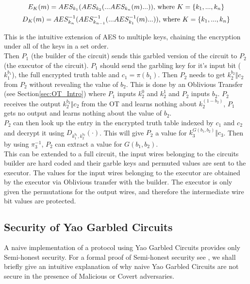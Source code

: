 \documentclass[ %
                    author={Nicholas Tutte},
                supervisor={Prof. Nigel Smart},
                    degree={MEng},
                     title={Secure Two Party Computation},
                  subtitle={A practical comparison of recent protocols},
                      type={Research - GG1K},
                      year={2015} ]{dissertation}
\begin{document}
			$$ E_K(m) = AES_{k_1}( AES_{k_2}( ...AES_{k_n}(m) ...) ) \textnormal{, where } K = \{k_1, ..., k_n\}$$ 
			$$ D_K(m) = AES^{-1}_{k_n}( AES^{-1}_{k_{n-1}}( ...AES^{-1}_{k_1}(m) ...) ) \textnormal{, where } K = \{k_1, ..., k_n\}$$ 

			This is the intuitive extension of AES to multiple keys, chaining the encryption under all of the keys in a set order.\\

			Then $P_1$ (the builder of the circuit) sends this garbled version of the circuit to $P_2$ (the executor of the circuit). $P_1$ should send the garbling key for it's input bit ($k_1^{b_1}$), the full encrypted truth table and $c_1 = \pi(b_1)$. Then $P_2$ needs to get $k_2^{b_2} \Vert c_2$ from $P_2$ without revealing the value of $b_2$. This is done by an Oblivious Transfer (see Section\ref{sec:OT_Intro}) where $P_1$ inputs $k_2^0$ and $k_2^1$ and $P_2$ inputs $b_2$. $P_2$ receives the output $k_2^{b_2} \Vert c_2$ from the OT and learns nothing about $k_2^{(1 - b_2)} $, $P_1$ gets no output and learns nothing about the value of $b_2$.\\

			$P_2$ can then look up the entry in the encrypted truth table indexed by $c_1$ and $c_2$ and decrypt it using $D_{k_1^{b_1}, k_2^{b_2}}(\cdot)$. This will give $P_2$ a value for $k_3^{G(b_1, b_2)} \Vert c_3$. Then by using $\pi_3^{-1}$, $P_2$ can extract a value for $G(b_1, b_2)$.\\

			This can be extended to a full circuit, the input wires belonging to the circuits builder are hard coded and their garble keys and permuted values are sent to the executor. The values for the input wires belonging to the executor are obtained by the executor via Oblivious transfer with the builder. The executor is only given the permutations for the output wires, and therefore the intermediate wire bit values are protected.

		\subsection{Security of Yao Garbled Circuits} \label{sub:YaoSecurity}
			A naive implementation of a protocol using Yao Garbled Circuits provides only Semi-honest security. For a formal proof of Semi-honest security see \cite{ProofOfYaoSecurity}, we shall briefly give an intuitive explanation of why naive Yao Garbled Circuits are not secure in the presence of Malicious or Covert adversaries.\\
\end{document}
